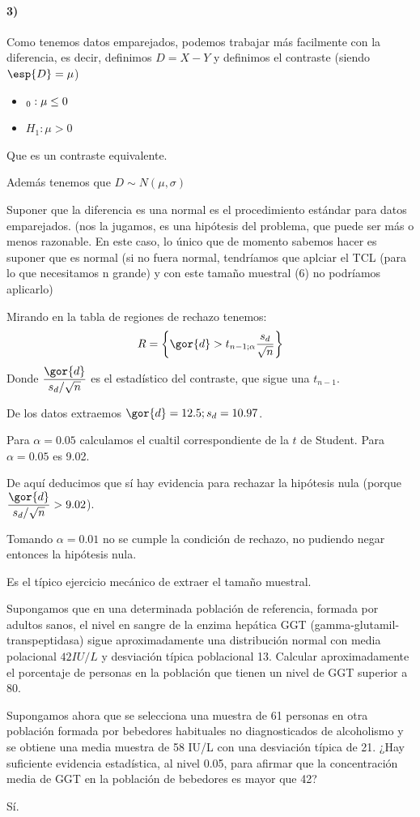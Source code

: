 \begin{problem}[6]
\paragraph{3)} Como tenemos datos emparejados, podemos trabajar más facilmente con la diferencia, es decir, definimos $D=X-Y$ y definimos el contraste (siendo $\esp{D}=\mu$)
\begin{itemize}
\item $\Huge_0 : \mu \leq 0$
\item $H_1: \mu >0$
\end{itemize}

Que es un contraste equivalente.

Además tenemos que $D \sim N(\mu,\sigma)$ 

Suponer que la diferencia es una normal es el procedimiento estándar para datos emparejados. (nos la jugamos, es una hipótesis del problema, que puede ser más o menos razonable. En este caso, lo único que de momento sabemos hacer es suponer que es normal (si no fuera normal, tendríamos que aplciar el TCL (para lo que necesitamos n grande) y con este tamaño muestral (6) no podríamos aplicarlo)

Mirando en la tabla de regiones de rechazo tenemos:
\[R = \left\{\gor{d}> t_{n-1;\alpha} \frac{s_d}{\sqrt{n}}\right\}\]
Donde $\displaystyle \frac{\gor{d}}{s_d/\sqrt{n}}$ es el estadístico del contraste, que sigue una $t_{n-1}$.

De los datos extraemos $\gor{d} = 12.5;s_d=10.97$.

Para $\alpha = 0.05$ calculamos el cualtil correspondiente de la $t$ de Student. Para $\alpha = 0.05$ es 9.02.

De aquí deducimos que sí hay evidencia para rechazar la hipótesis nula (porque  $\displaystyle \frac{\gor{d}}{s_d/\sqrt{n}} > 9.02$).

\spart Tomando $\alpha = 0.01$ no se cumple la condición de rechazo, no pudiendo negar entonces la hipótesis nula.

\spart Es el típico ejercicio mecánico de extraer el tamaño muestral.
\end{problem}


\begin{problem}[8] 

\ppart Supongamos que en una determinada población de referencia, formada por adultos sanos, el nivel en sangre de la enzima hepática GGT (gamma-glutamil-transpeptidasa) sigue aproximadamente una distribución normal con media polacional $42 IU/L$ y desviación típica poblacional 13. Calcular aproximadamente el porcentaje de personas en la población que tienen un nivel de GGT superior a 80.

\ppart Supongamos ahora que se selecciona una muestra de 61 personas en otra población formada por bebedores habituales no diagnosticados de alcoholismo y se obtiene una media muestra de 58 IU/L con una desviación típica de 21. ¿Hay suficiente evidencia estadística, al nivel 0.05, para afirmar que la concentración media de GGT en la población de bebedores es mayor que 42?

\solution

Sí.

\end{problem}

